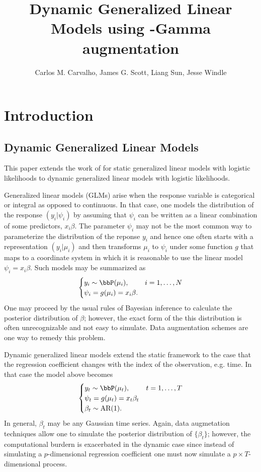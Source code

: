 \documentclass[11pt]{article}
\title{Dynamic Generalized Linear Models using \Polya-Gamma augmentation}
\author{Carlos M. Carvalho, James G. Scott, Liang Sun, Jesse Windle}
\begin{document}
\maketitle
\tableofcontents

\newpage

\section{Introduction}

\subsection{Dynamic Generalized Linear Models}

This paper extends the work of \cite{polson-etal-2012} for static generalized
linear models with logistic likelihoods to dynamic generalized linear models
with logistic likelihoods.  

Generalized linear models (GLMs) arise when the response variable is categorical
or integral as opposed to continuous.  In that case, one models the distribution
of the response $(y_i | \psi_i)$ by assuming that $\psi_i$ can be written as a
linear combination of some predictors, $x_i \beta$.  The parameter $\psi_i$ may
not be the most common way to parameterize the distribution of the reponse $y_i$
and hence one often starts with a representation $(y_i | \mu_i)$ and then
transforms $\mu_i$ to $\psi_i$ under some function $g$ that maps to a coordinate
system in which it is reasonable to use the linear model $\psi_i = x_i \beta$.
Such models may be summarized as
\[
\begin{cases}
y_i \sim \bbP(\mu_i), & i=1,\ldots, N \\
\psi_i = g(\mu_i) = x_i \beta.
\end{cases}
\]
One may proceed by the usual rules of Bayesian inference to calculate the
posterior distribution of $\beta$; however, the exact form of the this
distribution is often unrecognizable and not easy to simulate.  Data
augmentation schemes are one way to remedy this problem.

Dynamic generalized linear models extend the static framework to the case that
the regression coefficient changes with the index of the observation, e.g. time.
In that case the model above becomes
\[
\begin{cases}
  y_t \sim \bbP(\mu_t), & t=1, \ldots, T \\
  \psi_t = g(\mu_t) = x_t \beta_t \\
  \beta_t \sim \text{AR}(1).
\end{cases}
\]
In general, $\beta_t$ may be any Gaussian time series.  Again, data augmetation
techniques allow one to simulate the posterior distribution of $\{\beta_t\}$;
however, the computational burdern is exacerbated in the dynamic case since
instead of simulating a $p$-dimensional regression coefficient one must now
simulate a $p \times T$-dimensional process.
\end{document}
